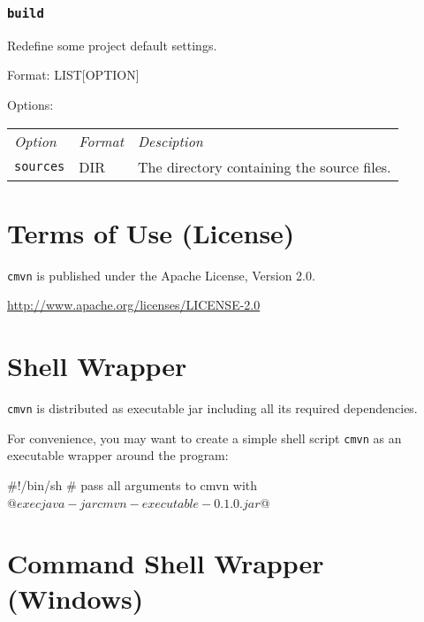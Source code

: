 \documentclass[a4paper,12pt,english,oneside,halfparskip]{scrartcl}
\newcommand{\CMVN}{\texttt{cmvn}}
\newcommand{\cmvn}{\texttt{cmvn}}
\newcommand{\code}[1]{\texttt{#1}}
\begin{document}
\subsubsection{\code{build}}

Redefine some project default settings.

Format: LIST[OPTION]

Options:

\begin{tabular}{llp{}}
\emph{Option} & \emph{Format} & \emph{Desciption} \\
\code{sources} &  DIR & The directory containing the source files. \\
\end{tabular}





\section{Terms of Use (License)}

\CMVN{} is published under the Apache License, Version 2.0.

\url{http://www.apache.org/licenses/LICENSE-2.0}

\clearpage
\appendix

\section{Shell Wrapper}

\cmvn{} is distributed as executable jar including all its required dependencies. 

For convenience, you may want to create a simple shell script \code{cmvn} as an executable wrapper around the program:

\begin{Cmdline}[caption={Shell wrapper: \code{mvu}}]
#!/bin/sh
# pass all arguments to cmvn with $@
exec java -jar cmvn-executable-0.1.0.jar $@
\end{Cmdline}

\section{Command Shell Wrapper (Windows)}
\end{document}
